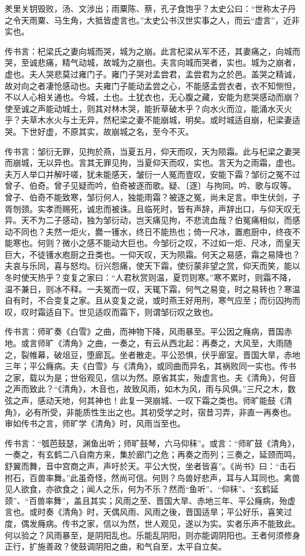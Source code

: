 \documentclass[]{article}
\begin{document}
羑里关钥毁败，汤、文涉出；雨粟陈、蔡，孔子食饱乎？太史公曰：``世称太子丹之令天雨粟、马生角，大抵皆虚言也。''太史公书汉世实事之人，而云``虚言''，近非实也。

传书言：杞梁氏之妻向城而哭，城为之崩。此言杞梁从军不还，其妻痛之，向城而哭，至诚悲痛，精气动城，故城为之崩也。夫言向城而哭者，实也。城为之崩者，虚也。夫人哭悲莫过雍门子。雍门子哭对孟尝君，孟尝君为之於邑。盖哭之精诚，故对向之者凄怆感动也。夫雍门子能动孟尝之心，不能感孟尝衣者，衣不知恻怛，不以人心相关通也。今城，土也。土犹衣也，无心腹之藏，安能为悲哭感动而崩？使至诚之声能动城土，则其对林木哭，能折草破木乎？向水火而泣，能涌水灭火乎？夫草木水火与土无异，然杞梁之妻不能崩城，明矣。或时城适自崩，杞梁妻适哭。下世好虚，不原其实，故崩城之名，至今不灭。

传书言：邹衍无罪，见拘於燕，当夏五月，仰天而叹，天为陨霜。此与杞梁之妻哭而崩城，无以异也。言其无罪见拘，当夏仰天而叹，实也。言天为之雨霜，虚也。夫万人举口并解吁嗟，犹未能感天，皱衍一人冤而壹叹，安能下霜？邹衍之冤不过曾子、伯奇。曾子见疑而吟，伯奇被逐而歌。疑、〔逐〕与拘同。吟、歌与叹等。曾子、伯奇不能致寒，邹衍何人，独能雨霜？被逐之冤，尚未足言。申生伏剑，子胥刎颈。实孝而赐死，诚忠而被诛。且临死时，皆有声辞，声辞出口，与仰天叹无异。天不为二子感动，独为邹衍动，岂天痛见拘，不悲流血哉？伯冤痛相似，而感动不同也？夫然一炬火，爨一镬水，终日不能热也；倚一尺冰，置庖厨中，终夜不能寒也。何则？微小之感不能动大巨也。今邹衍之叹，不过如一炬、尺冰，而皇天巨大，不徒镬水庖厨之丑类也。一仰天叹，天为陨霜。何天之易感，霜之易降也？夫哀与乐同，喜与怒均。衍兴怨痛，使天下霜，使衍蒙非望之赏，仰天而笑，能以冬时使天热乎？变复之家曰：``人君秋赏则温，夏罚则寒。''寒不累时，则霜不降，温不兼日，则冰不释。一夫冤而一叹，天辄下霜，何气之易变，时之易转也？寒温自有时，不合变复之家。且从变复之说，或时燕王好用刑，寒气应至；而衍囚拘而叹，叹时霜适自下。世见适叹而霜下，则谓邹衍叹之致也。

传书言：师旷奏《白雪》之曲，而神物下降，风雨暴至。平公因之癃病，晋国赤地。或言师旷《清角》之曲，一奏之，有云从西北起：再奏之，大风至，大雨随之，裂帷幕，破俎豆，堕廊瓦。坐者散走。平公恐惧，伏乎廊室。晋国大旱，赤地三年；平公癃病。夫《白雪》与《清角》，或同曲而异名，其祸败同一实也。传书之家，载以为是；世俗观见，信以为然。原省其实，殆虚言也。夫《清角》，何音之声而致此？``《清角》，木音也，故致风雨，如木为风，雨与风俱。''三尺之木，数弦之声，感动天地，何其神也！此复一哭崩城、一叹下霜之类也。师旷能鼓《清角》，必有所受，非能质性生出之也。其初受学之时，宿昔习弄，非直一再奏也。审如传书之言，师旷学《清角》时，风雨当至也。

传书言：``瓠芭鼓瑟，渊鱼出听；师旷鼓琴，六马仰秣''。或言：``师旷鼓《清角》，一奏之，有玄鹤二八自南方来，集於廊门之危；再奏之而列；三奏之，延颈而鸣，舒翼而舞，音中宫商之声，声吁於天。平公大悦，坐者皆喜''。《尚书》曰：``击石拊石，百兽率舞。''此虽奇怪，然尚可信。何则？鸟兽好悲声，耳与人耳同也。禽兽见人欲食，亦欲食之；闻人之乐，何为不乐？然而``鱼听''、``仰秣''、``玄鹤延颈''、``百兽率舞''，盖且其实；风雨之至、晋国大旱、赤地三年、平公癃病，殆虚言也。或时奏《清角》时，天偶风雨、风雨之後，晋国适旱；平公好乐，喜笑过度，偶发癃病。传书之家，信以为然，世人观见，遂以为实。实者乐声不能致此。何以验之？风雨暴至，是阴阳乱也。乐能乱阴阳，则亦能调阴阳也。王者何须修身正行，扩施善政？使鼓调阴阳之曲，和气自至，太平自立矣。
\end{document}

